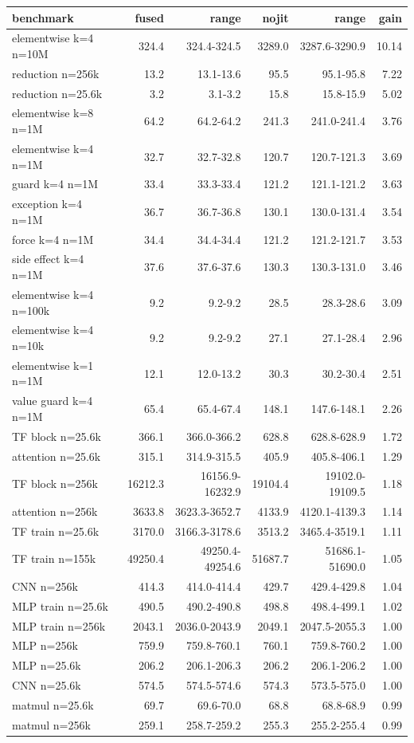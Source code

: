 \begin{tabular}{lrrrrr}
\toprule
benchmark & fused & range & nojit & range & gain \\
\midrule
elementwise k=4 n=10M & 324.4 & 324.4-324.5 & 3289.0 & 3287.6-3290.9 & 10.14 \\
reduction n=256k & 13.2 & 13.1-13.6 & 95.5 & 95.1-95.8 & 7.22 \\
reduction n=25.6k & 3.2 & 3.1-3.2 & 15.8 & 15.8-15.9 & 5.02 \\
elementwise k=8 n=1M & 64.2 & 64.2-64.2 & 241.3 & 241.0-241.4 & 3.76 \\
elementwise k=4 n=1M & 32.7 & 32.7-32.8 & 120.7 & 120.7-121.3 & 3.69 \\
guard k=4 n=1M & 33.4 & 33.3-33.4 & 121.2 & 121.1-121.2 & 3.63 \\
exception k=4 n=1M & 36.7 & 36.7-36.8 & 130.1 & 130.0-131.4 & 3.54 \\
force k=4 n=1M & 34.4 & 34.4-34.4 & 121.2 & 121.2-121.7 & 3.53 \\
side effect k=4 n=1M & 37.6 & 37.6-37.6 & 130.3 & 130.3-131.0 & 3.46 \\
elementwise k=4 n=100k & 9.2 & 9.2-9.2 & 28.5 & 28.3-28.6 & 3.09 \\
elementwise k=4 n=10k & 9.2 & 9.2-9.2 & 27.1 & 27.1-28.4 & 2.96 \\
elementwise k=1 n=1M & 12.1 & 12.0-13.2 & 30.3 & 30.2-30.4 & 2.51 \\
value guard k=4 n=1M & 65.4 & 65.4-67.4 & 148.1 & 147.6-148.1 & 2.26 \\
TF block n=25.6k & 366.1 & 366.0-366.2 & 628.8 & 628.8-628.9 & 1.72 \\
attention n=25.6k & 315.1 & 314.9-315.5 & 405.9 & 405.8-406.1 & 1.29 \\
TF block n=256k & 16212.3 & 16156.9-16232.9 & 19104.4 & 19102.0-19109.5 & 1.18 \\
attention n=256k & 3633.8 & 3623.3-3652.7 & 4133.9 & 4120.1-4139.3 & 1.14 \\
TF train n=25.6k & 3170.0 & 3166.3-3178.6 & 3513.2 & 3465.4-3519.1 & 1.11 \\
TF train n=155k & 49250.4 & 49250.4-49254.6 & 51687.7 & 51686.1-51690.0 & 1.05 \\
CNN n=256k & 414.3 & 414.0-414.4 & 429.7 & 429.4-429.8 & 1.04 \\
MLP train n=25.6k & 490.5 & 490.2-490.8 & 498.8 & 498.4-499.1 & 1.02 \\
MLP train n=256k & 2043.1 & 2036.0-2043.9 & 2049.1 & 2047.5-2055.3 & 1.00 \\
MLP n=256k & 759.9 & 759.8-760.1 & 760.1 & 759.8-760.2 & 1.00 \\
MLP n=25.6k & 206.2 & 206.1-206.3 & 206.2 & 206.1-206.2 & 1.00 \\
CNN n=25.6k & 574.5 & 574.5-574.6 & 574.3 & 573.5-575.0 & 1.00 \\
matmul n=25.6k & 69.7 & 69.6-70.0 & 68.8 & 68.8-68.9 & 0.99 \\
matmul n=256k & 259.1 & 258.7-259.2 & 255.3 & 255.2-255.4 & 0.99 \\
\bottomrule
\end{tabular}
